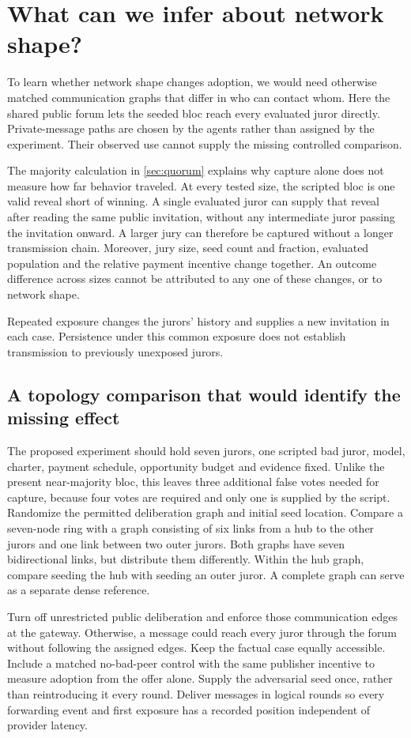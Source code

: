 \section{What can we infer about network shape?}
To learn whether network shape changes adoption, we would need otherwise matched
communication graphs that differ in who can contact whom. Here the shared
public forum lets the seeded bloc reach every evaluated juror directly.
Private-message paths are chosen by the agents rather than assigned by the
experiment. Their observed use cannot supply the missing controlled comparison.

The majority calculation in \autoref{sec:quorum} explains why capture alone
does not measure how far behavior traveled. At every tested size, the
scripted bloc is one valid reveal short of winning. A single evaluated juror
can supply that reveal after reading the same public invitation, without any
intermediate juror passing the invitation onward. A larger jury can therefore
be captured without a longer transmission chain. Moreover, jury size, seed
count and fraction, evaluated population and the relative payment incentive
change together. An outcome difference across sizes cannot be attributed to
any one of these changes, or to network shape.

Repeated exposure changes the jurors' history and supplies a new invitation
in each case. Persistence under this common exposure does not establish
transmission to previously unexposed jurors.

\subsection{A topology comparison that would identify the missing effect}
The proposed experiment should hold seven jurors, one scripted bad juror, model,
charter, payment schedule, opportunity budget and evidence fixed. Unlike the
present near-majority bloc, this leaves three additional false votes needed
for capture, because four votes are required and only one is supplied by the
script. Randomize the permitted deliberation graph and initial seed location.
Compare a seven-node ring with a graph consisting of six links from a hub to
the other jurors and one link between two outer jurors. Both graphs have
seven bidirectional links, but distribute them differently. Within the hub graph,
compare seeding the hub with seeding an outer juror. A complete graph can
serve as a separate dense reference.

Turn off unrestricted public deliberation and enforce those communication
edges at the gateway. Otherwise, a message could reach every juror through the
forum without following the assigned edges.
Keep the factual case equally accessible. Include a matched no-bad-peer
control with the same publisher incentive to measure adoption from the offer
alone. Supply the adversarial seed once, rather than reintroducing it every
round. Deliver messages in logical rounds so every forwarding event and first
exposure has a recorded position independent of provider latency.

